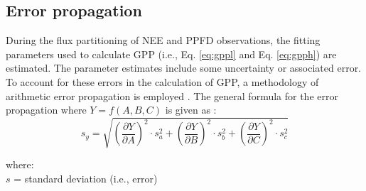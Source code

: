 \subsection{Error propagation}
\label{sec:mst1errprop}
During the flux partitioning of NEE and PPFD observations, the fitting parameters used to calculate GPP (i.e., Eq. \ref{eq:gppl} and Eq. \ref{eq:gpph}) are estimated.  
The parameter estimates include some uncertainty or associated error.  
To account for these errors in the calculation of GPP, a methodology of arithmetic error propagation is employed \parencite{caldwell14}.  
The general formula for the error propagation where $Y=f(A,B,C)$ is given as \parencite{ku66}:
\begin{equation}
\label{eq:errprop}
	s_{y} = \sqrt{
		\left(\frac{\partial Y}{\partial A}\right)^{2} \cdot s_{a}^{2} +
		\left(\frac{\partial Y}{\partial B}\right)^{2} \cdot s_{b}^{2} +
		\left(\frac{\partial Y}{\partial C}\right)^{2} \cdot s_{c}^{2}
		}
\end{equation}

\noindent where:\\
\indent $s$ = standard deviation (i.e., error)\\

